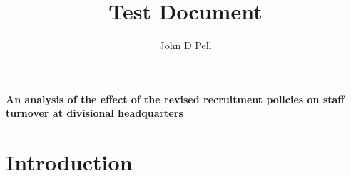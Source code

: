 \documentclass[12pt]{gWmaths}
\author{John D Pell}
\title{Test Document}
\begin{document}
	\maketitle
	\begin{abstract}
		\blindtext
	\end{abstract}

\tableofcontents
\listoffigures
\listoftables

\paragraph[Effect on staff turnover]{An analysis of the
effect of the revised recruitment policies on staff
turnover at divisional headquarters}

{}
\section*{Introduction}

	\blinddocument
\end{document}
